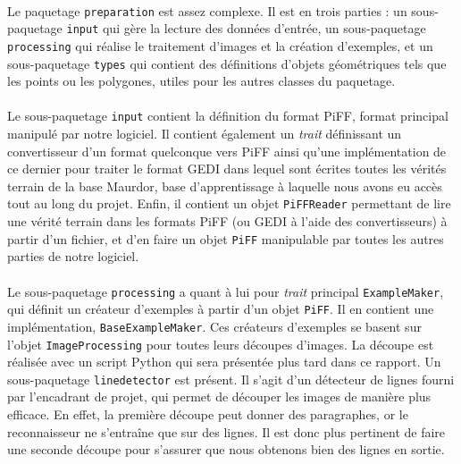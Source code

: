 \paragraph{}
Le paquetage \texttt{preparation} est assez complexe. Il est en trois parties : un sous-paquetage \texttt{input} qui gère la lecture des données d'entrée, un sous-paquetage \texttt{processing} qui réalise le traitement d'images et la création d'exemples, et un sous-paquetage \texttt{types} qui contient des définitions d'objets géométriques tels que les points ou les polygones, utiles pour les autres classes du paquetage.

\paragraph{}
Le sous-paquetage \texttt{input} contient la définition du format PiFF, format principal manipulé par notre logiciel. Il contient également un \textit{trait} définissant un convertisseur d'un format quelconque vers PiFF ainsi qu'une implémentation de ce dernier pour traiter le format GEDI dans lequel sont écrites toutes les vérités terrain de la base Maurdor, base d'apprentissage à laquelle nous avons eu accès tout au long du projet. Enfin, il contient un objet \texttt{PiFFReader} permettant de lire une vérité terrain dans les formats PiFF (ou GEDI à l'aide des convertisseurs) à partir d'un fichier, et d'en faire un objet \texttt{PiFF} manipulable par toutes les autres parties de notre logiciel.

\paragraph{}
Le sous-paquetage \texttt{processing} a quant à lui pour \textit{trait} principal \texttt{ExampleMaker}, qui définit un créateur d'exemples à partir d'un objet \texttt{PiFF}. Il en contient une implémentation, \texttt{BaseExampleMaker}. Ces créateurs d'exemples se basent sur l'objet \texttt{ImageProcessing} pour toutes leurs découpes d'images. La découpe est réalisée avec un script Python qui sera présentée plus tard dans ce rapport. Un sous-paquetage \texttt{linedetector} est présent. Il s'agit d'un détecteur de lignes fourni par l'encadrant de projet, qui permet de découper les images de manière plus efficace. En effet, la première découpe peut donner des paragraphes, or le reconnaisseur ne s'entraîne que sur des lignes. Il est donc plus pertinent de faire une seconde découpe pour s'assurer que nous obtenons bien des lignes en sortie.


